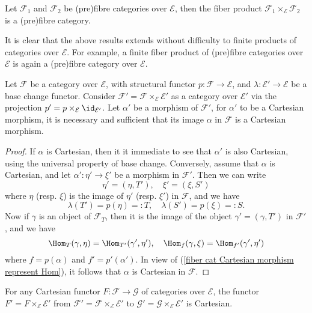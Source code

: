 \begin{corollary}\label{fibre cat product is fibre}
Let $\mathcal{F}_1$ and $\mathcal{F}_2$ be (pre)fibre categories over $\mathcal{E}$, then the fiber product $\mathcal{F}_1\times_\mathcal{E}\mathcal{F}_2$ is a (pre)fibre category.
\end{corollary}
It is clear that the above results extends without difficulty to finite products of categories over $\mathcal{E}$. For example, a finite fiber product of (pre)fibre categories over $\mathcal{E}$ is again a (pre)fibre category over $\mathcal{E}$.
\begin{proposition}\label{fibre cat morphism Cartesian iff base change}
Let $\mathcal{F}$ be a category over $\mathcal{E}$, with structural functor $p:\mathcal{F}\to \mathcal{E}$, and $\lambda:\mathcal{E}'\to \mathcal{E}$ be a base change functor. Consider $\mathcal{F}'=\mathcal{F}\times_\mathcal{E}\mathcal{E}'$ as a category over $\mathcal{E}'$ via the projection $p'=p\times_\mathcal{E}\id_{\mathcal{E}'}$. Let $\alpha'$ be a morphism of $\mathcal{F}'$, for $\alpha'$ to be a Cartesian morphism, it is necessary and sufficient that its image $\alpha$ in $\mathcal{F}$ is a Cartesian morphism.
\end{proposition}
\begin{proof}
If $\alpha$ is Cartesian, then it it immediate to see that $\alpha'$ is also Cartesian, using the universal property of base change. Conversely, assume that $\alpha$ is Cartesian, and let $\alpha':\eta'\to \xi'$ be a morphism in $\mathcal{F}'$. Then we can write
\[\eta'=(\eta,T'),\quad \xi'=(\xi,S')\]
where $\eta$ (resp. $\xi$) is the image of $\eta'$ (resp. $\xi'$) in $\mathcal{F}$, and we have
\[\lambda(T')=p(\eta)=:T,\quad \lambda(S')=p(\xi)=:S.\]
Now if $\gamma$ is an object of $\mathcal{F}_T$, then it is the image of the object $\gamma'=(\gamma,T')$ in $\mathcal{F}'$, and we have
\[\Hom_T(\gamma,\eta)=\Hom_{T'}(\gamma',\eta'),\quad \Hom_f(\gamma,\xi)=\Hom_{f'}(\gamma',\eta')\]
where $f=p(\alpha)$ and $f'=p'(\alpha')$. In view of (\ref{fiber cat Cartesian morphism represent Hom}), it follows that $\alpha$ is Cartesian in $\mathcal{F}$. 
\end{proof}
\begin{corollary}\label{fibre cat functor base change is Cartesian}
For any Cartesian functor $F:\mathcal{F}\to \mathcal{G}$ of categories over $\mathcal{E}$, the functor $F'=F\times_\mathcal{E}\mathcal{E}'$ from $\mathcal{F}'=\mathcal{F}\times_\mathcal{E}\mathcal{E}'$ to $\mathcal{G}'=\mathcal{G}\times_\mathcal{E}\mathcal{E}'$ is Cartesian.
\end{corollary}
